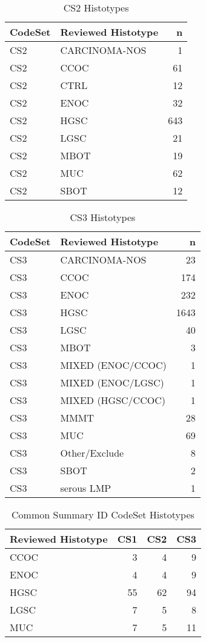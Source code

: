 \documentclass[
]{report}
\begin{document}
\begin{table}

\caption{\label{tab:dist-cs2}CS2 Histotypes}
\centering
\begin{tabular}[t]{l|l|r}
\hline
CodeSet & Reviewed Histotype & n\\
\hline
CS2 & CARCINOMA-NOS & 1\\
\hline
CS2 & CCOC & 61\\
\hline
CS2 & CTRL & 12\\
\hline
CS2 & ENOC & 32\\
\hline
CS2 & HGSC & 643\\
\hline
CS2 & LGSC & 21\\
\hline
CS2 & MBOT & 19\\
\hline
CS2 & MUC & 62\\
\hline
CS2 & SBOT & 12\\
\hline
\end{tabular}
\end{table}

\begin{table}

\caption{\label{tab:dist-cs3}CS3 Histotypes}
\centering
\begin{tabular}[t]{l|l|r}
\hline
CodeSet & Reviewed Histotype & n\\
\hline
CS3 & CARCINOMA-NOS & 23\\
\hline
CS3 & CCOC & 174\\
\hline
CS3 & ENOC & 232\\
\hline
CS3 & HGSC & 1643\\
\hline
CS3 & LGSC & 40\\
\hline
CS3 & MBOT & 3\\
\hline
CS3 & MIXED (ENOC/CCOC) & 1\\
\hline
CS3 & MIXED (ENOC/LGSC) & 1\\
\hline
CS3 & MIXED (HGSC/CCOC) & 1\\
\hline
CS3 & MMMT & 28\\
\hline
CS3 & MUC & 69\\
\hline
CS3 & Other/Exclude & 8\\
\hline
CS3 & SBOT & 2\\
\hline
CS3 & serous LMP & 1\\
\hline
\end{tabular}
\end{table}

\begin{table}

\caption{\label{tab:dist-common}Common Summary ID CodeSet Histotypes}
\centering
\begin{tabular}[t]{l|r|r|r}
\hline
Reviewed Histotype & CS1 & CS2 & CS3\\
\hline
CCOC & 3 & 4 & 9\\
\hline
ENOC & 4 & 4 & 9\\
\hline
HGSC & 55 & 62 & 94\\
\hline
LGSC & 7 & 5 & 8\\
\hline
MUC & 7 & 5 & 11\\
\hline
\end{tabular}
\end{table}
\end{document}
